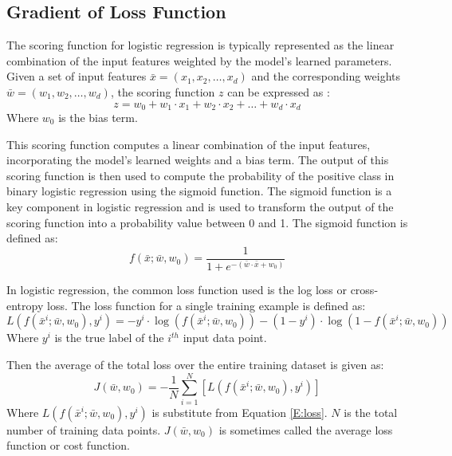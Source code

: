 \documentclass[12pt, a4paper, twoside]{article}
\begin{document}
\subsection{Gradient of Loss Function}\label{SS:lr-grad}
The scoring function for logistic regression is typically represented as the linear combination of the input features weighted by the model's learned parameters. Given a set of input features $\bar{x} = (x_1, x_2, \dots , x_d)$
and the corresponding weights $\bar{w} = (w_1, w_2, \dots , w_d)$, the scoring function $z$ can be expressed as \cite{ddl_book}:
\begin{equation}
	z = w_0 + w_1 \cdot x_1 + w_2 \cdot x_2 + \dots + w_d \cdot x_d
\end{equation}
Where $w_0$ is the bias term.

This scoring function computes a linear combination of the input features, incorporating the model's learned weights and a bias term. The output of this scoring function is then used to compute the probability of the positive class in binary logistic regression using the sigmoid function. The sigmoid function is a key component in logistic regression and is used to transform the output of the scoring function into a probability value between 0 and 1. The sigmoid function is defined as:
\begin{equation}\label{E:sigmoid}
	f(\bar{x}; \bar{w}, w_0) = \frac{1}{1 + e^{-(\bar{w} \cdot \bar{x} + w_0)}}
\end{equation}

In logistic regression, the common loss function used is the log loss or cross-entropy loss. The loss function for a single training example is defined as:
\begin{equation}\label{E:loss}
	L(f(\bar{x}^i; \bar{w}, w_0), y^i) = -y^i \cdot \log (f(\bar{x}^i; \bar{w}, w_0)) - (1-y^i) \cdot \log (1 - f(\bar{x}^i; \bar{w}, w_0))
\end{equation}
Where $y^i$ is the true label of the $i^{th}$ input data point.

Then the average of the total loss over the entire training dataset is given as:
\begin{equation}
	J(\bar{w}, w_0) = - \frac{1}{N} \sum_{i = 1}^{N} \left[   L(f(\bar{x}^i; \bar{w}, w_0), y^i)    \right]
\end{equation}
Where $L(f(\bar{x}^i; \bar{w}, w_0), y^i)$ is substitute from Equation \ref{E:loss}. $N$ is the total number of training data points. $J(\bar{w}, w_0)$ is sometimes called the average loss function or cost function.
\end{document}
